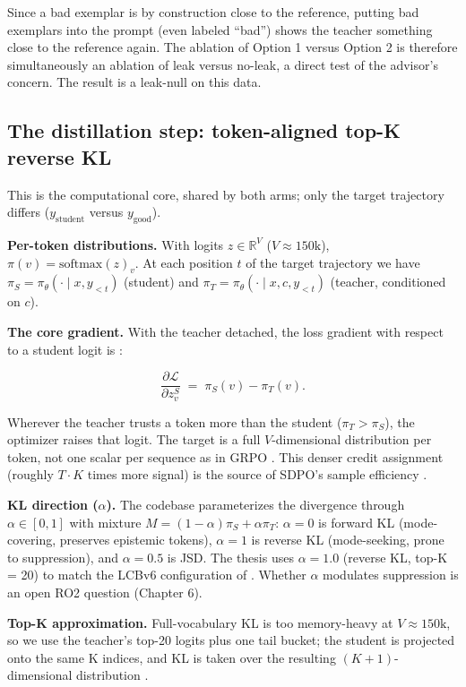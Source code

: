 Since a bad exemplar is by construction close to the reference, putting bad exemplars into the prompt (even labeled ``bad'') shows the teacher something close to the reference again. The ablation of Option 1 versus Option 2 is therefore simultaneously an ablation of leak versus no-leak, a direct test of the advisor's concern. The result is a leak-null on this data.

\subsection{The distillation step: token-aligned top-K reverse KL}\label{the-distillation-step-token-aligned-top-k-reverse-kl}

This is the computational core, shared by both arms; only the target trajectory differs (\(y_{\text{student}}\) versus \(y_{\text{good}}\)).

\textbf{Per-token distributions.} With logits \(z \in \mathbb{R}^V\) (\(V \approx 150\text{k}\)), \(\pi(v) = \mathrm{softmax}(z)_v\). At each position \(t\) of the target trajectory we have \(\pi_S = \pi_\theta(\cdot\mid x, y_{<t})\) (student) and \(\pi_T = \pi_\theta(\cdot \mid x, c, y_{<t})\) (teacher, conditioned on \(c\)).

\textbf{The core gradient.} With the teacher detached, the loss gradient with respect to a student logit is \cite{r1}:

\[
\frac{\partial \mathcal{L}}{\partial z_v^{S}} \;=\; \pi_S(v) - \pi_T(v).
\]

Wherever the teacher trusts a token more than the student (\(\pi_T > \pi_S\)), the optimizer raises that logit. The target is a full \(V\)-dimensional distribution per token, not one scalar per sequence as in GRPO \cite{r8}. This denser credit assignment (roughly \(T \cdot K\) times more signal) is the source of SDPO's sample efficiency \cite{r1}.

\textbf{KL direction (\(\alpha\)).} The codebase \cite{r4} parameterizes the divergence through \(\alpha \in [0,1]\) with mixture \(M = (1-\alpha)\pi_S + \alpha\pi_T\): \(\alpha = 0\) is forward KL (mode-covering, preserves epistemic tokens), \(\alpha = 1\) is reverse KL (mode-seeking, prone to suppression), and \(\alpha = 0.5\) is JSD. The thesis uses \(\alpha = 1.0\) (reverse KL, top-K = 20) to match the LCBv6 configuration of \cite{r4}. Whether \(\alpha\) modulates suppression is an open RO2 question (Chapter 6).

\textbf{Top-K approximation.} Full-vocabulary KL is too memory-heavy at \(V \approx 150\text{k}\), so we use the teacher's top-20 logits plus one tail bucket; the student is projected onto the same K indices, and KL is taken over the resulting \((K{+}1)\)-dimensional distribution \cite{r1}.

